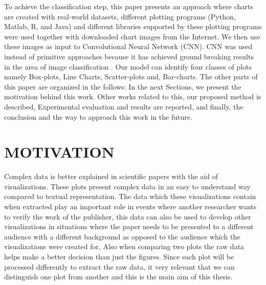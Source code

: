 \documentclass[12pt, a4paper,oneside]{report}
\begin{document}
To achieve the classification step, this paper presents an approach where charts are created with real-world datasets, different plotting programs (Python, Matlab, R, and Java) and different libraries supported by these plotting programs were used together with downloaded chart images from the Internet. We then use these images as input to Convolutional Neural Network (CNN). CNN was used instead of primitive approaches because it has achieved ground breaking results in the area of image classification \cite{amara2017convolutional}. Our model can identify four classes of plots namely Box-plots, Line Charts, Scatter-plots and, Bar-charts.
The other parts of this paper are organized in the follows: 
In the next Sections, we present the motivation behind this work. Other works related to this,  our proposed method is described,
Experimental evaluation and results are reported, and finally, the conclusion and the way to approach this work in the future.

\section{MOTIVATION}
Complex data is better explained in scientific papers with the aid of visualizations. These plots present complex data in an easy to understand way compared to textual representation. The data which these visualizations contain when extracted play an important role in events where another researcher wants to verify the work of the publisher, this data can also be used to develop other visualizations in situations where the paper needs to be presented to a different audience with a different background as opposed to the audience which the visualizations were created for, Also when comparing two plots the raw data helps make a better decision than just the figures. Since each plot will be processed differently to extract the raw data, it very relevant that we can distinguish one plot from another and this is the main aim of this thesis. 
\end{document}
